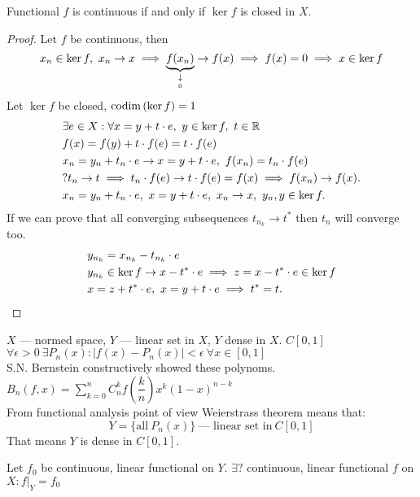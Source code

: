 \begin{thm}
  Functional $f$ is continuous if and only if $\ker{f}$ is closed in $X$.
\end{thm}

\begin{proof}
  Let $f$ be continuous, then 
  \[
    x_n \in \ker{f},\ x_n \to x \implies
    \underbrace{f(x_n)}_{\underset{0}{\downarrow}} \to f(x) \implies f(x) = 0 \implies x \in \ker{f}
  \]
  Let $\ker{f}$ be closed, $\operatorname{codim}{(\ker{f})} = 1$
  \begin{align*}
    &\exists e \in X : \forall x = y + t \cdot e,\ y \in \ker{f},\ t \in \mathbb{R} \\
    &f(x) = f(y) + t \cdot f(e) = t \cdot f(e) \\
    &x_n = y_n + t_n \cdot e \to x = y + t \cdot e,\ f(x_n) = t_n \cdot f(e)\\
    &?t_n \to t \implies t_n \cdot f(e) \to t \cdot f(e) = f(x) \implies f(x_n) \to
      f(x). \\
    &x_n = y_n + t_n \cdot e,\ x = y + t \cdot e,\ x_n \to x,\ y_n,y \in \ker{f}.
  \end{align*}
  If we can prove that all converging subsequences $t_{n_k} \to t^*$ then $t_n$ will
  converge too. 
  \begin{align*}
    &y_{n_k} = x_{n_k} - t_{n_k} \cdot e \\
    &y_{n_k} \in \ker{f} \to x - t^* \cdot e \implies z = x - t^*
      \cdot e \in \ker{f} \\
    &x = z + t^* \cdot e,\ x = y + t \cdot e \implies t^* = t. \qedhere
  \end{align*}
\end{proof}

\noindent
$X$ --- normed space, $Y$ --- linear set in $X$, $Y$ dense in $X$.
$C[0, 1]$ \\
$\forall \epsilon > 0\ \exists P_n(x) : |f(x) - P_n(x)| < \epsilon\ \forall x \in [0, 1]$\\ 
S.N. Bernstein constructively showed these polynoms. \\
$B_n(f, x) = \sum\limits_{k = 0}^n C_n^k f(\dfrac{k}{n}) x^k (1 - x)^{n - k}$ \\
From functional analysis point of view Weierstrass theorem means that:
\[
  Y = \{\text{all}\ P_n(x)\}\ \text{--- linear set in}\ C[0, 1]
\]
That means $Y$ is dense in $C[0, 1]$.

\begin{note}
  Let $f_0$ be continuous, linear functional on $Y$. $\exists ?$ continuous,
  linear functional $f$ on $X : f|_Y = f_0$
\end{note}

